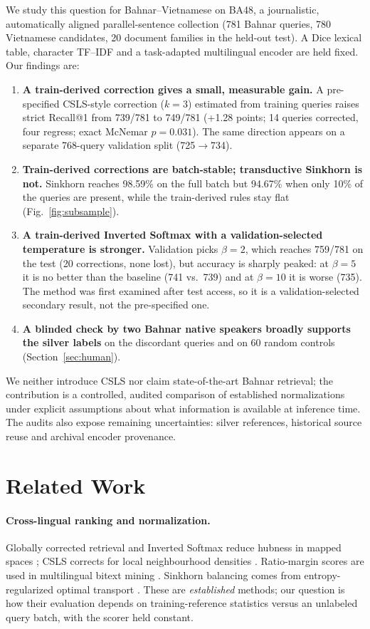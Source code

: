 We study this question for Bahnar--Vietnamese on BA48, a journalistic, automatically aligned parallel-sentence collection (781 Bahnar queries, 780 Vietnamese candidates, 20 document families in the held-out test). A Dice lexical table, character TF--IDF and a task-adapted multilingual encoder are held fixed. Our findings are:
\begin{enumerate}
\item \textbf{A train-derived correction gives a small, measurable gain.} A pre-specified CSLS-style correction ($k=3$) estimated from training queries raises strict Recall@1 from 739/781 to 749/781 (+1.28 points; 14 queries corrected, four regress; exact McNemar $p=0.031$). The same direction appears on a separate 768-query validation split (725$\to$734).
\item \textbf{Train-derived corrections are batch-stable; transductive Sinkhorn is not.} Sinkhorn reaches 98.59\% on the full batch but 94.67\% when only 10\% of the queries are present, while the train-derived rules stay flat (Fig.~\ref{fig:subsample}).
\item \textbf{A train-derived Inverted Softmax with a validation-selected temperature is stronger.} Validation picks $\beta=2$, which reaches 759/781 on the test (20 corrections, none lost), but accuracy is sharply peaked: at $\beta=5$ it is no better than the baseline (741 vs.\ 739) and at $\beta=10$ it is worse (735). The method was first examined after test access, so it is a validation-selected secondary result, not the pre-specified one.
\item \textbf{A blinded check by two Bahnar native speakers broadly supports the silver labels} on the discordant queries and on 60 random controls (Section~\ref{sec:human}).
\end{enumerate}
We neither introduce CSLS nor claim state-of-the-art Bahnar retrieval; the contribution is a controlled, audited comparison of established normalizations under explicit assumptions about what information is available at inference time. The audits also expose remaining uncertainties: silver references, historical source reuse and archival encoder provenance.

\section{Related Work}
\paragraph{Cross-lingual ranking and normalization.} Globally corrected retrieval and Inverted Softmax reduce hubness in mapped spaces \cite{dinu2015improving,smith2017offline}; CSLS corrects for local neighbourhood densities \cite{conneau2018word}. Ratio-margin scores are used in multilingual bitext mining \cite{artetxe2019margin}. Sinkhorn balancing comes from entropy-regularized optimal transport \cite{cuturi2013sinkhorn}. These are \emph{established} methods; our question is how their evaluation depends on training-reference statistics versus an unlabeled query batch, with the scorer held constant.

